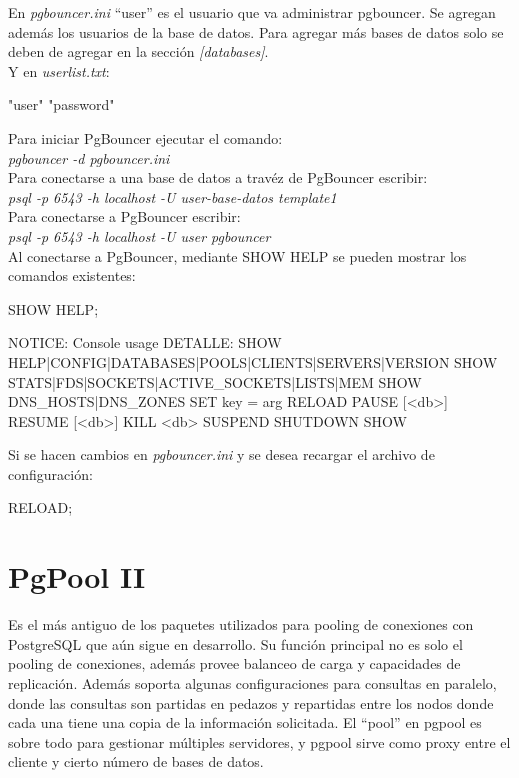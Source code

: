 En \textit{pgbouncer.ini} ``user'' es el usuario que va administrar pgbouncer. Se agregan además los usuarios de la base de datos. Para agregar más bases de datos solo se deben de agregar en la sección \emph{[databases]}.\\

Y en \textit{userlist.txt}:\\

\begin{pyglist}
"user" "password"
\end{pyglist}

Para iniciar PgBouncer ejecutar el comando:\\

\emph{pgbouncer -d pgbouncer.ini} \\

Para conectarse a una base de datos a travéz de PgBouncer escribir:\\

\emph{psql -p 6543 -h localhost -U user-base-datos template1}\\

Para conectarse a PgBouncer escribir:\\

\emph{psql -p 6543 -h localhost -U user pgbouncer}\\

Al conectarse a PgBouncer, mediante SHOW HELP se pueden mostrar los comandos existentes:\\


\begin{pyglist}
SHOW HELP;

NOTICE:  Console usage
DETALLE:  
	SHOW HELP|CONFIG|DATABASES|POOLS|CLIENTS|SERVERS|VERSION
	SHOW STATS|FDS|SOCKETS|ACTIVE_SOCKETS|LISTS|MEM
	SHOW DNS_HOSTS|DNS_ZONES
	SET key = arg
	RELOAD
	PAUSE [<db>]
	RESUME [<db>]
	KILL <db>
	SUSPEND
	SHUTDOWN
SHOW
\end{pyglist}

Si se hacen cambios en \textit{pgbouncer.ini} y se desea recargar el archivo de configuración:\\

\begin{pyglist}
RELOAD;
\end{pyglist}

\section{PgPool II}

Es el más antiguo de los paquetes utilizados para pooling de conexiones con PostgreSQL que aún sigue en desarrollo. Su función principal no es solo el pooling de conexiones, además provee balanceo de carga y capacidades de replicación. Además soporta algunas configuraciones para consultas en paralelo, donde las consultas son partidas en pedazos y repartidas entre los nodos donde cada una tiene una copia de la información solicitada. El ``pool'' en pgpool es sobre todo para gestionar múltiples servidores, y pgpool sirve como proxy entre el cliente y cierto número de bases de datos.\\

